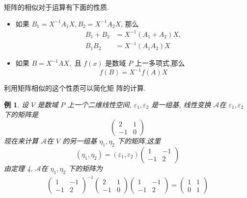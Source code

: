 \documentclass[13pt]{beamer}
\newtheorem{exa}{例}
\def\A{\mathscr{A}}
\begin{document}
\begin{frame}
矩阵的相似对于运算有下面的性质.  

\begin{itemize}
	\item 如果 ${B}_{1}={X}^{-1} {A}_{1} {X}, {B}_{2}={X}^{-1} {A}_{2} {X}$, 那么
\begin{align*}
	{B}_{1}+{B}_{2} & ={X}^{-1}\left({A}_{1}+{A}_{2}\right) {X}, \\
	{B}_{1} {B}_{2} & ={X}^{-1}\left({A}_{1} {A}_{2}\right) {X}
\end{align*}
	\item 如果 ${B}={X}^{-1} {A} {X},$ 且 $f(x)$ 是数域 $P$ 上一多项式,那么
	\[
	f({B})={X}^{-1} f({A}) {X}
	\]
	
\end{itemize}

\end{frame}

\begin{frame}
利用矩阵相似的这个性质可以简化矩
阵的计算. 
\begin{exa}
设 $V$ 是数域 $P$ 上一个二维线性空间, ${\varepsilon}_{1}, {\varepsilon}_{2}$ 是一组基,
线性变换 $\A$在 ${\varepsilon}_{1}, {\varepsilon}_{2}$ 下的矩阵是
\[
\left(\begin{array}{rr}
2 & 1 \\
-1 & 0
\end{array}\right)
\]
现在来计算 $\A$在 $V$ 的另一组基 ${\eta}_{1}, {\eta}_{2}$ 下的矩阵,这里
\[
\left({\eta}_{1}, {\eta}_{2}\right)=\left({\varepsilon}_{1}, {\varepsilon}_{2}\right)\left(\begin{array}{rr}
1 & -1 \\
-1 & 2
\end{array}\right)
\]
由定理 4, $\A$在 ${\eta}_{1}, {\eta}_{2}$ 下的矩阵为
\[
\begin{array}{l}
\left(\begin{array}{rr}
1 & -1 \\
-1 & 2
\end{array}\right)^{-1}\left(\begin{array}{rr}
2 & 1 \\
-1 & 0
\end{array}\right)\left(\begin{array}{rr}
1 & -1 \\
-1 & 2
\end{array}\right) =\left(\begin{array}{rr}
1 & 1 \\
0 & 1
\end{array}\right)
\end{array}
\]
\end{exa}
\end{frame}
\end{document}
